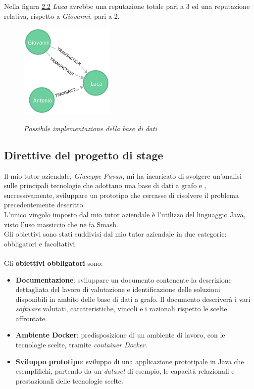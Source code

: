 Nella figura \hyperref[fig:figura 2.2]{2.2} \textit{Luca} avrebbe una reputazione totale pari a 3 ed una reputazione relativa, rispetto a \textit{Giovanni}, pari a 2.
\begin{figure}[h!]
	\centering
	\includegraphics[scale=0.8]{immagini/grafo1.png}
	\label{fig:figura 2.2}
	\caption{\textit{Possibile implementazione della base di dati}}
\end{figure}
\label{sec:pianodl}
\subsection{Direttive del progetto di stage}
Il mio tutor aziendale, \textit{Giuseppe Pavan}, mi ha incaricato di svolgere un'analisi sulle principali tecnologie che adottano una base di dati a grafo e , successivamente, sviluppare un prototipo che cercasse di risolvere il problema precedentemente descritto.\\
L'unico vingolo imposto dal mio tutor aziendale è l'utilizzo del linguaggio Java, visto l'uso massiccio che ne fa Smash\textregistered.\\
Gli obiettivi sono stati suddivisi dal mio tutor aziendale in due categorie: obbligatori e facoltativi.\\
\\
Gli \textbf{obiettivi obbligatori} sono:
\begin{itemize}
\item{\textbf{Documentazione}:} sviluppare un documento contenente la descrizione dettagliata del lavoro di valutazione e identificazione delle soluzioni disponibili in ambito delle base di dati a grafo. Il documento descriverà i vari \textit{software} valutati, caratteristiche, vincoli e i razionali rispetto le scelte affrontate.
\item{\textbf{Ambiente Docker\glsfirstoccur}:} predisposizione di un ambiente di lavoro, con le tecnologie scelte, tramite \textit{container Docker}.
\item{\textbf{Sviluppo prototipo}:} sviluppo di una applicazione prototipale in Java che esemplifichi, partendo da un \textit{dataset} di esempio, le capacità relazionali e prestazionali delle tecnologie scelte.
\end{itemize}

